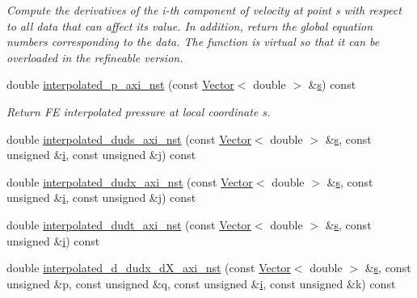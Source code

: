 \begin{DoxyCompactItemize}
\begin{DoxyCompactList}\small\item\em Compute the derivatives of the i-\/th component of velocity at point s with respect to all data that can affect its value. In addition, return the global equation numbers corresponding to the data. The function is virtual so that it can be overloaded in the refineable version. \end{DoxyCompactList}\item 
double \hyperlink{classoomph_1_1AxisymmetricNavierStokesEquations_ab355488fd99663f08df3aa24d8a8eec4}{interpolated\+\_\+p\+\_\+axi\+\_\+nst} (const \hyperlink{classoomph_1_1Vector}{Vector}$<$ double $>$ \&\hyperlink{cfortran_8h_ab7123126e4885ef647dd9c6e3807a21c}{s}) const
\begin{DoxyCompactList}\small\item\em Return FE interpolated pressure at local coordinate s. \end{DoxyCompactList}\item 
double \hyperlink{classoomph_1_1AxisymmetricNavierStokesEquations_a1cc63eac8d17b2973b5fde4a3dc8f767}{interpolated\+\_\+duds\+\_\+axi\+\_\+nst} (const \hyperlink{classoomph_1_1Vector}{Vector}$<$ double $>$ \&\hyperlink{cfortran_8h_ab7123126e4885ef647dd9c6e3807a21c}{s}, const unsigned \&\hyperlink{cfortran_8h_adb50e893b86b3e55e751a42eab3cba82}{i}, const unsigned \&j) const
\item 
double \hyperlink{classoomph_1_1AxisymmetricNavierStokesEquations_a233e8e9b387e218ed8047f66778561b2}{interpolated\+\_\+dudx\+\_\+axi\+\_\+nst} (const \hyperlink{classoomph_1_1Vector}{Vector}$<$ double $>$ \&\hyperlink{cfortran_8h_ab7123126e4885ef647dd9c6e3807a21c}{s}, const unsigned \&\hyperlink{cfortran_8h_adb50e893b86b3e55e751a42eab3cba82}{i}, const unsigned \&j) const
\item 
double \hyperlink{classoomph_1_1AxisymmetricNavierStokesEquations_a9273991703fe6e7fb0fa48d61135426d}{interpolated\+\_\+dudt\+\_\+axi\+\_\+nst} (const \hyperlink{classoomph_1_1Vector}{Vector}$<$ double $>$ \&\hyperlink{cfortran_8h_ab7123126e4885ef647dd9c6e3807a21c}{s}, const unsigned \&\hyperlink{cfortran_8h_adb50e893b86b3e55e751a42eab3cba82}{i}) const
\item 
double \hyperlink{classoomph_1_1AxisymmetricNavierStokesEquations_a6b9d0da30e29b199c962ed943317e4f0}{interpolated\+\_\+d\+\_\+dudx\+\_\+d\+X\+\_\+axi\+\_\+nst} (const \hyperlink{classoomph_1_1Vector}{Vector}$<$ double $>$ \&\hyperlink{cfortran_8h_ab7123126e4885ef647dd9c6e3807a21c}{s}, const unsigned \&p, const unsigned \&q, const unsigned \&\hyperlink{cfortran_8h_adb50e893b86b3e55e751a42eab3cba82}{i}, const unsigned \&k) const

\end{DoxyCompactItemize}
